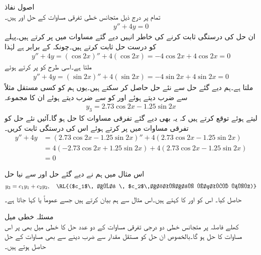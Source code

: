 \quad اصول نفاذ\\
تمام  پر درج ذیل متجانس خطی تفرقی مساوات کے حل  اور  ہیں۔
\begin{align*}
y''+4y=0
\end{align*}
ان حل کی درستگی ثابت کرنے کی خاطر انہیں دیے گئے مساوات میں پر کرتے ہیں۔پہلے  کو درست حل ثابت کرتے ہیں۔چونکہ  کے برابر ہے لہٰذا 
\begin{align*}
y''+4y=(\cos 2x)''+4(\cos 2x)=-4\cos 2x+4\cos 2x=0
\end{align*}
ملتا ہے۔اسی طرح  کو پر کرتے ہوئے 
\begin{align*}
y''+4y=(\sin 2x)''+4(\sin 2x)=-4\sin 2x+4\sin 2x=0
\end{align*}
ملتا ہے۔ہم دیے گئے حل سے نئے حل حاصل کر سکتے ہیں۔یوں ہم  کو کسی مستقل مثلاً  سے ضرب دیتے ہوئے اور  کو   سے ضرب دیتے ہوئے ان کا مجموعہ
\begin{align*}
y_3=2.73\cos 2x-1.25\sin 2x
\end{align*}
لیتے ہوئے  توقع کرتے ہیں کہ یہ بھی دیے گئے تفرقی مساوات کا حل ہو گا۔آئیں نئے حل کو تفرقی مساوات میں پر کرتے ہوئے اس کی درستگی ثابت کریں۔
\begin{align*}
y''+4y&=(2.73\cos 2x-1.25\sin 2x)''+4(2.73\cos 2x-1.25\sin 2x)\\
&=4(-2.73\cos 2x+1.25\sin 2x)+4(2.73\cos 2x-1.25\sin 2x)\\
&=0
\end{align*}

اس مثال میں ہم نے دیے گئے حل  اور  سے نیا حل 
\begin{align}
y_3=c_1 y_1+c_2 y_2, \quad \text{\RL{($c_1$\, اور \, $c_2$\,اختیاری مستقل ہیں)}}
\end{align}
حاصل کیا۔ اس کو  اور  کا  کہتے ہیں۔اس مثال سے ہم  بیان کرتے ہیں جسے عموماً  یا  کہا جاتا ہے۔


\quad مسئلہ خطی میل\\
کھلے فاصلہ  پر متجانس خطی دو درجی تفرقی مساوات کے دو عدد حل کا خطی میل بھی  پر اس مساوات کا حل ہو گا۔بالخصوص ان حل کو مستقل مقدار سے ضرب دینے سے بھی مساوات کے حل حاصل ہوتے ہیں۔

